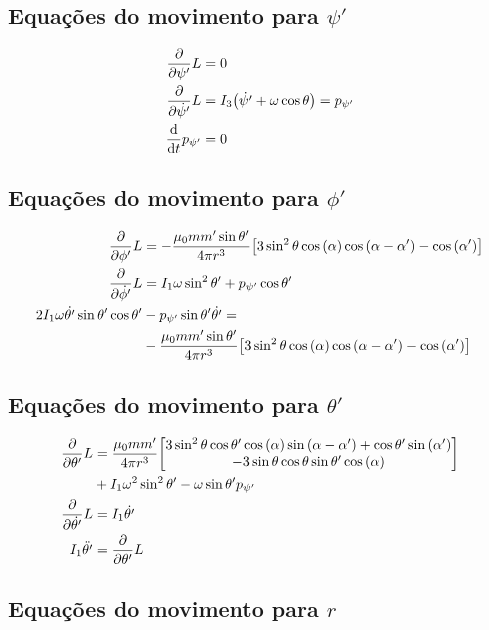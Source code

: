\documentclass[a4paper, 12pt]{article}
\begin{document}
\subsection{Equações do movimento para $\psi'$}

\begin{align}
    \pdv{}{\psi'}L&=0\nonumber\\
    \pdv{}{\dot{\psi'}}L&=I_3\qty(\dot{\psi'}+\omega\cos\theta)=p_{\psi'}\nonumber\\
    \dv{}{t}p_{\psi'}&=0
\end{align}

\subsection{Equações do movimento para $\phi'$}

\begin{align}
    \pdv{}{\phi'}L&=-\frac{\mu_0mm'\sin\theta'}{4\pi r^3}\qty[3\sin^2\theta\cos\qty(\alpha)\cos\qty(\alpha-\alpha')-\cos\qty(\alpha')]\nonumber\\
    \pdv{}{\dot{\phi'}}L&=I_1\omega\sin^2\theta'+p_{\psi'}\cos\theta'\nonumber\\
    2I_1\omega\dot{\theta'}\sin\theta'\cos\theta'&-p_{\psi'}\sin\theta'\dot{\theta'}=\nonumber\\
    &-\frac{\mu_0mm'\sin\theta'}{4\pi r^3}\qty[3\sin^2\theta\cos\qty(\alpha)\cos\qty(\alpha-\alpha')-\cos\qty(\alpha')]
\end{align}

\subsection{Equações do movimento para $\theta'$}

\begin{align}
    \pdv{}{\theta'}L&=\frac{\mu_0mm'}{4\pi r^3}\mqty[3\sin^2\theta\cos\theta'\cos\qty(\alpha)\sin\qty(\alpha-\alpha')+\cos\theta'\sin\qty(\alpha')\\
    -3\sin\theta\cos\theta\sin\theta'\cos\qty(\alpha)]\nonumber\\
    &+I_1\omega^2\sin^2\theta'-\omega\sin\theta'p_{\psi'}\nonumber\\
    \pdv{}{\dot{\theta'}}L&=I_1\dot{\theta'}\nonumber\\
    I_1\ddot{\theta'}&=\pdv{}{\theta'}L
\end{align}

\subsection{Equações do movimento para $r$}
\end{document}
